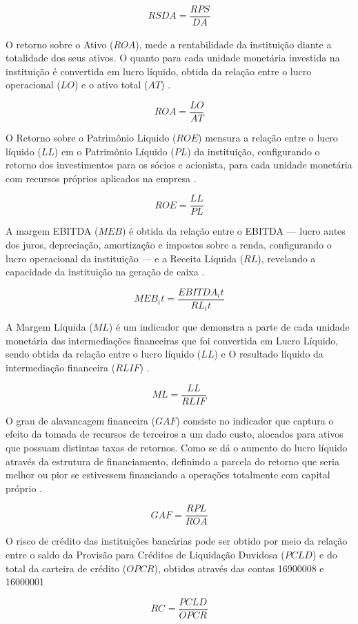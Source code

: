 \documentclass[12pt,openright,oneside,a4paper,chapter=TITLE,section=TITLE,subsection=TITLE,english,french,spanish,portugues,sumario=tradicional]{abntex2}
\begin{document}
\[
RSDA = \frac{RPS_{}}{DA_{}}
\]

O retorno sobre o Ativo (\(ROA\)), mede a rentabilidade da instituição diante a totalidade dos seus ativos. O quanto para cada unidade monetária investida na instituição é convertida em lucro líquido, obtida da relação entre o lucro operacional (\(LO\)) e o ativo total (\(AT\)) \cite{assaf:2020}.

\[
ROA = \frac{LO}{AT}
\]

O Retorno sobre o Patrimônio Liquido (\(ROE\)) mensura a relação entre o lucro líquido (\(LL\)) em o Patrimônio Líquido (\(PL\)) da instituição, configurando o retorno dos investimentos para os sócios e acionista, para cada unidade monetária com recursos próprios aplicados na empresa \cite{assaf:2020}.

\[
ROE = \frac{LL}{PL}
\]

A margem EBITDA (\(MEB\)) é obtida da relação entre o EBITDA --- lucro antes dos juros, depreciação, amortização e impostos sobre a renda, configurando o lucro operacional da instituição --- e a Receita Líquida (\(RL\)), revelando a capacidade da instituição na geração de caixa \cite{assaf:2020}.

\[
MEB_it = \frac{EBITDA_it}{RL_it}
\]

A Margem Líquida (\(ML\)) é um indicador que demonstra a parte de cada unidade monetária das intermediações financeiras que foi convertida em Lucro Líquido, sendo obtida da relação entre o lucro líquido (\(LL\)) e O resultado líquido da intermediação financeira (\(RLIF\)) \cite{assaf:2020}.

\[
ML = \frac{LL}{RLIF}
\]

O grau de alavancagem financeira (\(GAF\)) consiste no indicador que captura o efeito da tomada de recursos de terceiros a um dado custo, alocados para ativos que possuam distintas taxas de retornos. Como se dá o aumento do lucro líquido através da estrutura de financiamento, definindo a parcela do retorno que seria melhor ou pior se estivessem financiando a operações totalmente com capital próprio \cite{assaf:2020}.

\[
GAF = \frac{RPL}{ROA}
\]

O risco de crédito das instituições bancárias pode ser obtido por meio da relação entre o saldo da Provisão para Créditos de Liquidação Duvidosa (\(PCLD\)) e do total da carteira de crédito (\(OPCR\)), obtidos através das contas 16900008 e 16000001 \cite{dantas:2012}

\[
RC_{} = \frac{PCLD_{}}{OPCR_{}}
\]
\end{document}
